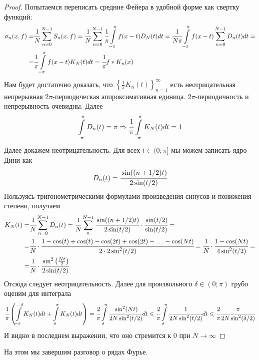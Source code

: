 \documentclass[a4paper, 12pt]{article}
\newcommand{\lmao}{неотрицательная непрерывная $2\pi$-периодическая аппроксимативная единица}
\begin{document}
	\begin{proof}
		Попытаемся переписать средние Фейера в удобной форме как свертку функций:
		\begin{align*}
			\sigma_n(x,f) =& \cfrac{1}{N}\sum\limits_{n=0}^{N-1}S_n(x,f) = \cfrac{1}{N}\sum\limits_{n=0}^{N-1}\cfrac{1}{\pi}\int\limits_{-\pi}^{\pi}f(x-t)D_N(t)dt = \cfrac{1}{N\pi}\int\limits_{-\pi}^{\pi}f(x-t)\sum\limits_{n=0}^{N-1}D_n(t)dt = \\ =& \cfrac{1}{\pi}\int\limits_{-\pi}^{\pi}f(x-t)K_N(t)dt = \cfrac{1}{\pi}f*K_n(x)
		\end{align*}
		Нам будет достаточно доказать, что $\left\{\frac{1}{\pi}K_n(t)\right\}_{n=1}^{\infty}$ есть \lmao. 
		$2\pi$-периодичность и непрерывность очевидны. Далее
		$$
			\int\limits_{-\pi}^{\pi}D_n(t) = \pi \Rightarrow \cfrac{1}{\pi} \int\limits_{-\pi}^{\pi}K_N(t) dt = 1
		$$
		Далее докажем неотрицательность. Для всех $t \in (0; \pi]$ мы можем записать ядро Дини как
		$$
			D_n(t) = \cfrac{\sin((n + 1/2)t)}{2\sin(t/2)}
		$$
		Пользуясь тригонометрическими формулами произведения синусов и понижения степени, получаем
		\begin{align}
			K_N(t) =& \cfrac{1}{N}\sum\limits_{n=0}^{N-1} D_n(t) = \cfrac{1}{N}\sum\limits_{n}^{N-1} \cfrac{\sin((n + 1/2)t)}{2\sin(t/2)}\cdot\cfrac{\sin(t/2)}{\sin(t/2)} = \\
			=& \cfrac{1}{N}\cdot \cfrac{1 - \cos(t) + \cos(t) - \cos(2t) + \cos(2t) - \ldots - \cos(Nt)}{2\cdot 2\sin^2(t/2)} = \cfrac{1}{N}\cdot \cfrac{1 - \cos(Nt)}{4\sin^2(t/2)} =\\
			=&\cfrac{1}{N}\cdot \cfrac{\sin^2\left(\frac{Nt}{2}\right)}{2\sin(t/2)}
	    \end{align}
	    Отсюда следует неотрицательность.
	    Далее для произвольного $\delta \in (0;\pi)$ грубо оценим для интеграла
	    \begin{gather}
	    	\cfrac{1}{\pi}\left(\int\limits_{-\pi}^{-\delta}K_N(t)dt + \int\limits_{\delta}^{\pi}K_N(t)dt\right) = \cfrac{2}{\pi}\int\limits_{\delta}^{\pi}\cfrac{\sin^2(Nt)}{2N\sin^2(t/2)}dt \leqslant \cfrac{2}{\pi}\int\limits_{\delta}^{\pi} \cfrac{1}{2N\sin^2(t/2)}dt \leqslant \cfrac{2}{\pi}\cfrac{\pi}{2N \sin^2(\delta/2)}
	    \end{gather}
	    И видно в последнем выражении, что оно стремится к 0 при $N \to \infty$
	\end{proof}
	На этом мы завершим разговор о рядах Фурье.
\end{document}
